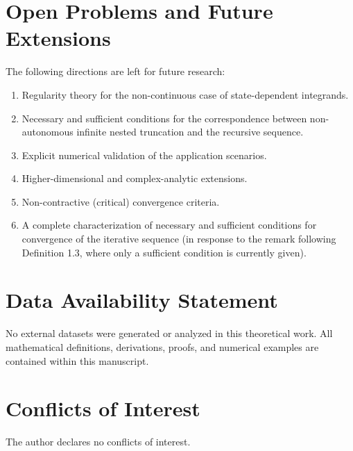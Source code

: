 \documentclass[11pt,a4paper]{amsart}
\begin{document}
\section*{Open Problems and Future Extensions}

The following directions are left for future research:

\begin{enumerate}
\item Regularity theory for the non-continuous case of state-dependent integrands.
\item Necessary and sufficient conditions for the correspondence between non-autonomous infinite nested truncation and the recursive sequence.
\item Explicit numerical validation of the application scenarios.
\item Higher-dimensional and complex-analytic extensions.
\item Non-contractive (critical) convergence criteria.
\item A complete characterization of necessary and sufficient conditions for convergence of the iterative sequence (in response to the remark following Definition 1.3, where only a sufficient condition is currently given).
\end{enumerate}


\section*{Data Availability Statement}
No external datasets were generated or analyzed in this theoretical work. All mathematical definitions, derivations, proofs, and numerical examples are contained within this manuscript.

\section*{Conflicts of Interest}
The author declares no conflicts of interest.
\end{document}
